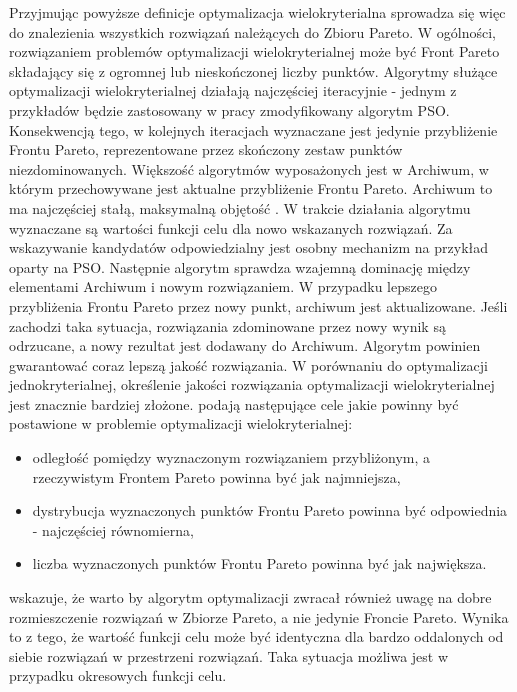 Przyjmując powyższe definicje optymalizacja wielokryterialna sprowadza się więc do znalezienia wszystkich rozwiązań należących do Zbioru Pareto. W ogólności, rozwiązaniem problemów optymalizacji wielokryterialnej może być Front Pareto składający się z ogromnej lub nieskończonej liczby punktów. Algorytmy służące optymalizacji wielokryterialnej działają najczęściej iteracyjnie - jednym z przykładów będzie zastosowany w pracy zmodyfikowany algorytm PSO. Konsekwencją tego, w kolejnych iteracjach wyznaczane jest jedynie przybliżenie Frontu Pareto, reprezentowane przez skończony zestaw punktów niezdominowanych. Większość algorytmów wyposażonych jest w Archiwum, w którym przechowywane jest aktualne przybliżenie Frontu Pareto. Archiwum to ma najczęściej stałą, maksymalną objętość \parencite{Banach2017}. W trakcie działania algorytmu wyznaczane są wartości funkcji celu dla nowo wskazanych rozwiązań. Za wskazywanie kandydatów odpowiedzialny jest osobny mechanizm na przykład oparty na PSO. Następnie algorytm sprawdza wzajemną dominację między elementami Archiwum i nowym rozwiązaniem. W przypadku lepszego przybliżenia Frontu Pareto przez nowy punkt, archiwum jest aktualizowane. Jeśli zachodzi taka sytuacja, rozwiązania zdominowane przez nowy wynik są odrzucane, a nowy rezultat jest dodawany do Archiwum. Algorytm powinien gwarantować coraz lepszą jakość rozwiązania. W porównaniu do optymalizacji jednokryterialnej, określenie jakości rozwiązania optymalizacji wielokryterialnej jest znacznie bardziej złożone. \cite{Zitzler2000} podają następujące cele jakie powinny być postawione w problemie optymalizacji wielokryterialnej:
\begin{itemize}[noitemsep]
	\item odległość pomiędzy wyznaczonym rozwiązaniem przybliżonym, a rzeczywistym Frontem Pareto powinna być jak najmniejsza,
	\item dystrybucja wyznaczonych punktów Frontu Pareto powinna być odpowiednia - najczęściej równomierna,
	\item liczba wyznaczonych punktów Frontu Pareto powinna być jak największa.
\end{itemize}

\cite{Banach2017} wskazuje, że warto by algorytm optymalizacji zwracał również uwagę na dobre rozmieszczenie rozwiązań w Zbiorze Pareto, a nie jedynie Froncie Pareto. Wynika to z tego, że wartość funkcji celu może być identyczna dla bardzo oddalonych od siebie rozwiązań w przestrzeni rozwiązań. Taka sytuacja możliwa jest w przypadku okresowych funkcji celu.

